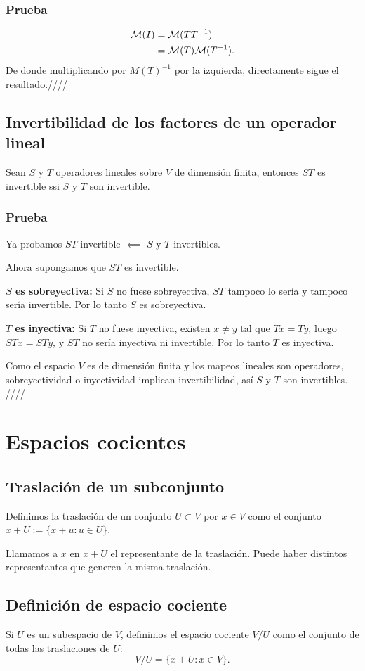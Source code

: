 \documentclass{article}
\begin{document}
\subsubsection*{Prueba}
\begin{align*}
    \mathcal{M}(I)&=\mathcal{M}(TT^{-1})\\
    &=\mathcal{M}(T)\mathcal{M}(T^{-1}).
\end{align*}
De donde multiplicando por $M(T)^{-1}$ por la izquierda,
directamente sigue el resultado.\hfill ////

\subsection{Invertibilidad de los factores de un operador lineal}
Sean $S$ y $T$ operadores lineales sobre $V$ de dimensión finita,
entonces $ST$ es invertible ssi $S$ y $T$ son invertible.
\subsubsection*{Prueba}
Ya probamos $ST$ invertible $\impliedby$ $S$ y $T$ invertibles.

Ahora supongamos que $ST$ es invertible.

\textbf{$S$ es sobreyectiva:} Si $S$ no fuese sobreyectiva, $ST$ tampoco lo sería y tampoco sería
invertible. Por lo tanto $S$ es sobreyectiva.

\textbf{$T$ es inyectiva:} Si $T$ no fuese inyectiva, existen $x\neq y$ tal que $Tx=Ty$,
luego $STx=STy$, y $ST$ no sería inyectiva ni invertible. Por lo
tanto $T$ es inyectiva.

Como el espacio $V$ es de dimensión finita y los mapeos lineales son 
operadores, sobreyectividad o inyectividad implican invertibilidad, así 
$S$ y $T$ son invertibles.
\hfill ////
\newpage

\section{Espacios cocientes}
\subsection{Traslación de un subconjunto}
Definimos la traslación de un conjunto $U\subset V$ por $x\in V$ como
el conjunto $x+U:=\{x+u: u\in U\}$.

Llamamos a $x$ en $x+U$ el representante de la traslación. Puede haber distintos representantes que generen la misma traslación.

\subsection{Definición de espacio cociente}
Si $U$ es un subespacio de $V$, definimos el espacio cociente
$V/U$ como el conjunto de todas las traslaciones de $U$:
$$V/U=\{x+U:x\in V\}.$$
\end{document}
